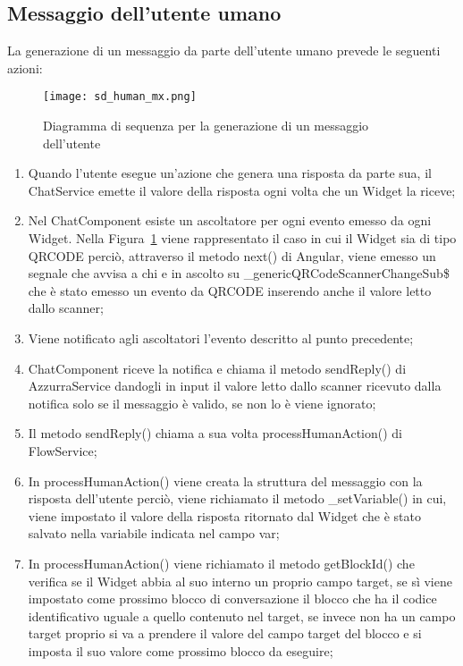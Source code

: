 \subsection{Messaggio dell’utente  umano}
La generazione di un messaggio da parte dell’utente umano prevede le seguenti azioni:\\
\begin{figure}[htbp]
	\centering
	\texttt{[image: sd\_human\_mx.png]}
	\caption{Diagramma di sequenza per la generazione di un messaggio dell'utente}\label{fig:mxHuman}
\end{figure}
\begin{enumerate}
	\item Quando l'utente esegue un'azione che genera una risposta da parte sua, il ChatService emette il valore della risposta ogni volta che un Widget la riceve;
	\item Nel ChatComponent esiste un ascoltatore per ogni evento emesso da ogni Widget. Nella Figura~\ref{fig:mxHuman} viene rappresentato il caso in cui il Widget sia di tipo QRCODE perciò, attraverso il metodo next() di Angular, viene emesso un segnale che avvisa a chi e in ascolto su \_genericQRCodeScannerChangeSub\$ che è stato emesso un evento da QRCODE inserendo anche il valore letto dallo scanner;
	\item Viene notificato agli ascoltatori l'evento descritto al punto precedente;
	\item ChatComponent riceve la notifica e chiama il metodo sendReply() di AzzurraService dandogli in input il valore letto dallo scanner ricevuto dalla notifica solo se il messaggio è valido, se non lo è viene ignorato;	
	\item Il metodo sendReply() chiama a sua volta processHumanAction() di FlowService;
	\item In processHumanAction() viene creata la struttura del messaggio con la risposta dell'utente perciò, viene richiamato il metodo \_setVariable() in cui, viene impostato il valore della risposta ritornato dal Widget che è stato salvato nella variabile indicata nel campo var;
	\item In processHumanAction() viene richiamato il metodo getBlockId() che verifica se il Widget abbia al suo interno un proprio campo target, se sì viene impostato come prossimo blocco di conversazione il blocco che ha il codice identificativo uguale a quello contenuto nel target, se invece non ha un campo target proprio si va a prendere il valore del campo target del blocco e si imposta il suo valore come prossimo blocco da eseguire;

\end{enumerate}
